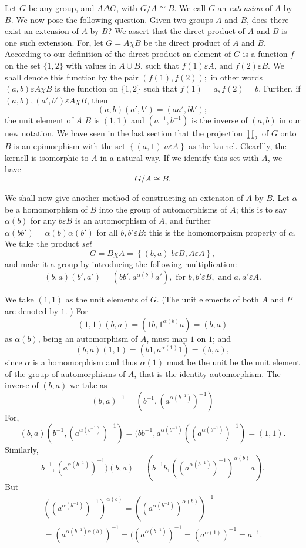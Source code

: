Let $G$ be any group, and $A \Delta G$, with $G/A \cong B$. We call
$G$ an \textit{extension} of $A$ by $B$. We now pose the following
question. Given two groups $A$ and $B$, does there exist an extension
of $A$ by $B$?  We assert that the direct product of $A$ and $B$ is
one such extension. For, let $G= A \chi B$ be the direct product of
$A$ and $B$. According  to our definition of the direct product an
element of $G$ is a function $f$ on the set  $\{ 1,2\}$ with values in
$A \cup B$, such that $f(1) \varepsilon A$, and $f(2)\varepsilon
B$. We shall denote this function by the pair $(f(1), f(2));$ in other
words $(a, b) \varepsilon A \chi B$ is the function on $\{ 1, 2 \}$
such that $f(1) = a, f(2) =b$. Further, if $(a, b), (a', b')
\varepsilon A \chi B$, then  
$$
(a, b)(a', b') = (aa', bb') ;
$$ 
the unit element of $A$ $B$ is $(1, 1)$ and $(a^{-1}, b^{-1})$ is the
inverse of $(a, b)$ in our new notation. We have seen in the last
section that the projection $\prod_2$ of $G$ onto $B$ is an
epimorphism with the set $\left\{ (a,1) \bigg| a \varepsilon A
\right\}$ as the karnel. Clearllly, the kernell is isomorphic to $A$
in a natural way. If we identify this set with $A$, we have  
$$
G/A \cong B.
$$

We shall now give another method of constructing an extension of $A$
by $B$. Let $\alpha$ be a homomorphism of $B$ into the group of
automorphisms of $A$; this is to say $\alpha (b)$ for any $b
\varepsilon B$ is an automorphism of $A$, and further $\alpha(bb') =
\alpha (b) \alpha(b')$ for all $ b, b' \varepsilon B$: this is the
homomorphism property of $\alpha$. We take the product \textit{set}  
$$
G=B \chi A= \left\{ (b,a) \bigg| b \varepsilon B, A \varepsilon A \right\},
$$
and make it a group by introducing the following multiplication: 
$$
(b, a)(b', a')= (bb', a^{\alpha(b')}a'), \text{ for } b, b'
\varepsilon B, \text{ and } a, a' \varepsilon A. 
$$

We take $(1, 1)$ as the unit elements of $G$. (The unit elements of
both $A$ and $P$ are denoted by $1$. ) For 
$$
(1, 1)(b, a) = (1b,1^{\alpha(b)}a) = (b,a)
$$
as $\alpha (b)$, being an automorphism of $A$, must map $1$ on $1$; and 
$$
(b, a)(1,1) =(b1, a^{\alpha (1)}1) = (b, a), 
$$ 
since $\alpha$ is a homomorphism and thus $\alpha (1)$ must be the
unit be the unit element of the group of automorphisms of $A$, that is
the identity automorphism. The inverse of $(b, a)$ we take as  
$$
(b, a)^{-1}= (b^{-1},(a^{\alpha(b^{-1})})^{-1})
$$
For,  
$$
(b,a)(b^{-1},(a^{\alpha(b^{-1})})^{-1}) = (bb^{-1},
a^{\alpha(b^{-1})}((a^{\alpha(b^{-1})})^{-1}) =(1,1).
$$ 
Similarly, 
$$
b^{-1},(a^{\alpha(b^{-1})})^{-1})(b,a)
=(b^{-1}b,((a^{\alpha(b^{-1})})^{-1})^{\alpha (b)}a).
$$ 
But 
\begin{multline*}
  ((a^{\alpha(b^{-1})})^{-1})^{\alpha (b)} =
  ((a^{\alpha(b^{-1})})^{\alpha (b)})^{-1}\\ 
  =(a^{\alpha(b^{-1}) \alpha
    (b)})^{-1}= ((a^{\alpha(b^{-1})})^{-1} = (a^{\alpha (1)})^{-1}=
  a^{-1}.
\end{multline*}

